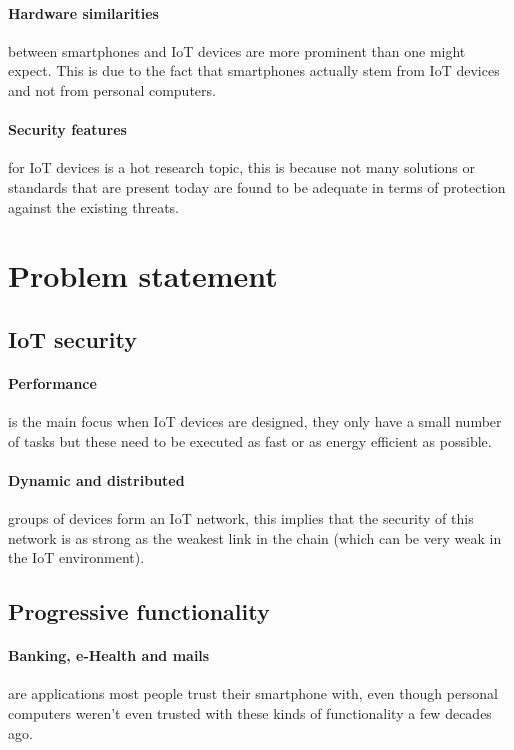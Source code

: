 \documentclass{report}
\begin{document}
\paragraph*{Hardware similarities}
between smartphones and IoT devices are more prominent than one might expect. This is due to the fact that smartphones actually stem from IoT devices and not from personal computers.

\paragraph*{Security features}
for IoT devices is a hot research topic, this is because not many solutions or standards that are present today are found to be adequate in terms of protection against the existing threats.

\section{Problem statement}

\subsection*{IoT security}

\paragraph*{Performance}
is the main focus when IoT devices are designed, they only have a small number of tasks but these need to be executed as fast or as energy efficient as possible.

\paragraph*{Dynamic and distributed} 
groups of devices form an IoT network, this implies that the security of this network is as strong as the weakest link in the chain (which can be very weak in the IoT environment).

\subsection*{Progressive functionality}

\paragraph*{Banking, e-Health and mails}
are applications most people trust their smartphone with, even though personal computers weren't even trusted with these kinds of functionality a few decades ago.
\end{document}

